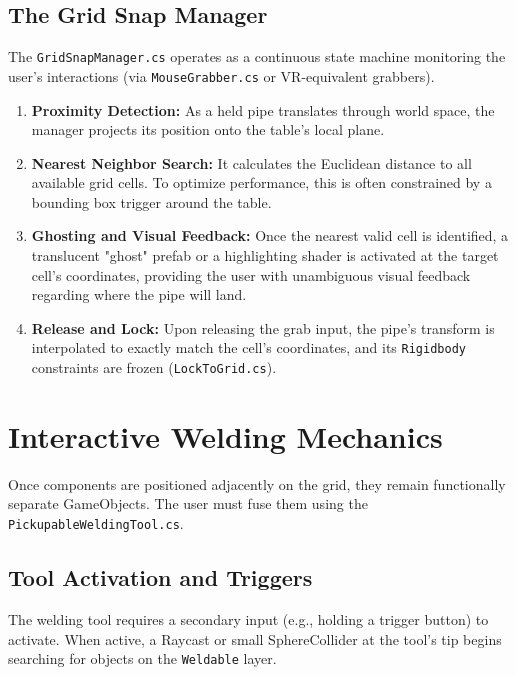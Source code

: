 \documentclass[12pt,a4paper,oneside]{report}
\begin{document}
\subsection{The Grid Snap Manager}
The \texttt{GridSnapManager.cs} operates as a continuous state machine monitoring the user's interactions (via \texttt{MouseGrabber.cs} or VR-equivalent grabbers). 
\begin{enumerate}
    \item \textbf{Proximity Detection:} As a held pipe translates through world space, the manager projects its position onto the table's local plane.
    \item \textbf{Nearest Neighbor Search:} It calculates the Euclidean distance to all available grid cells. To optimize performance, this is often constrained by a bounding box trigger around the table.
    \item \textbf{Ghosting and Visual Feedback:} Once the nearest valid cell is identified, a translucent "ghost" prefab or a highlighting shader is activated at the target cell's coordinates, providing the user with unambiguous visual feedback regarding where the pipe will land.
    \item \textbf{Release and Lock:} Upon releasing the grab input, the pipe's transform is interpolated to exactly match the cell's coordinates, and its \texttt{Rigidbody} constraints are frozen (\texttt{LockToGrid.cs}).
\end{enumerate}

\section{Interactive Welding Mechanics}
Once components are positioned adjacently on the grid, they remain functionally separate GameObjects. The user must fuse them using the \texttt{PickupableWeldingTool.cs}.

\subsection{Tool Activation and Triggers}
The welding tool requires a secondary input (e.g., holding a trigger button) to activate. When active, a Raycast or small SphereCollider at the tool's tip begins searching for objects on the \texttt{Weldable} layer.
\end{document}
